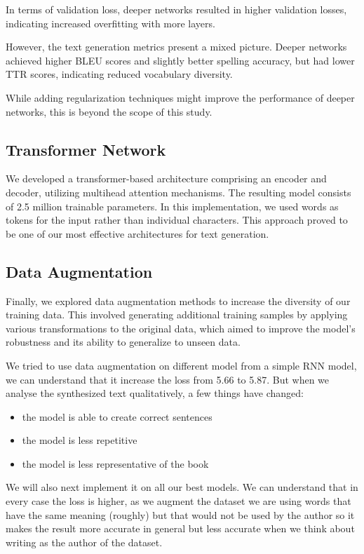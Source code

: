 \documentclass{article}
\begin{document}
In terms of validation loss, deeper networks resulted in higher validation losses, indicating increased overfitting with more layers.

However, the text generation metrics present a mixed picture. Deeper networks achieved higher BLEU scores and slightly better spelling accuracy, but had lower TTR scores, indicating reduced vocabulary diversity.

While adding regularization techniques might improve the performance of deeper networks, this is beyond the scope of this study.



\subsection{Transformer Network}

We developed a transformer-based architecture comprising an encoder and decoder, utilizing multihead attention mechanisms. The resulting model consists of 2.5 million trainable parameters. In this implementation, we used words as tokens for the input rather than individual characters. This approach proved to be one of our most effective architectures for text generation.

\subsection{Data Augmentation}

Finally, we explored data augmentation methods to increase the diversity of our training data. This involved generating additional training samples by applying various transformations to the original data, which aimed to improve the model's robustness and its ability to generalize to unseen data.

We tried to use data augmentation on different model from a simple RNN model, we can understand that it increase the loss from 5.66 to 5.87. But when we analyse the synthesized text qualitatively, a few things have changed:
\begin{itemize}
    \item the model is able to create correct sentences
    \item the model is less repetitive 
    \item the model is less representative of the book
\end{itemize}
We will also next implement it on all our best models. 
We can understand that in every case the loss is higher, as we augment the dataset we are using words that have the same meaning (roughly) but that would not be used by the author so it makes the result more accurate in general but less accurate when we think about writing as the author of the dataset.
\end{document}
